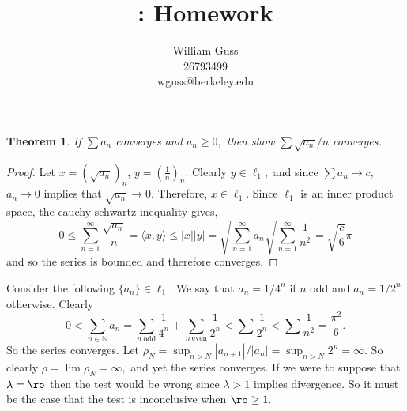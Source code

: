\documentclass[letter]{article}
\title{\bCLASS: Homework \bHWN}
\author{William Guss\\26793499\\wguss@berkeley.edu}
\newtheorem{theorem}{Theorem}
\newenvironment{menumerate}{%
  \edef\backupindent{\the\parindent}%
  \enumerate%
  \setlength{\parindent}{\backupindent}%
}{\endenumerate}
\begin{document}
\maketitle
\thispagestyle{empty}

	\begin{menumerate}
		\setcounter{enumi}{58}
		\item %

		\begin{theorem}
			If $\sum a_n$ converges and $a_n \geq 0,$ then show $\sum \sqrt{a_n}/n$ converges.
		\end{theorem}

		\begin{proof}
			Let $x = (\sqrt{a_n})_n$, $y = \left(\frac{1}{n}\right)_n$. Clearly $y \in \ell_1,$ and since $\sum a_n \to c,$ $a_n \to 0$ implies that $\sqrt{a_n} \to 0.$ Therefore, $x \in \ell_1.$ Since $\ell_1$ is an inner product space, the cauchy schwartz inequality gives, 
			$$0 \leq \sum_{n=1}^\infty \frac{\sqrt{a_n}}{n} = \langle x,y \rangle \leq |x||y| = \sqrt{\sum_{n=1}^\infty a_n} \sqrt{\sum_{n=1}^\infty \frac{1}{n^2}} = \sqrt{\frac{c}{6}}\pi$$
			and so the series is bounded and therefore converges.
		\end{proof}

		\setcounter{enumi}{60}
		\item Consider the following $\{a_n\} \in \ell_1.$ We say that $a_n = 1/4^n$ if $n$ odd and $a_n = 1/2^n$ otherwise. Clearly $$0 < \sum_{n\in\mathbb{N}}a_n = \sum_{n\ \text{odd}} \frac{1}{4^n} + \sum_{n\ \text{even}} \frac{1}{2^n} < \sum \frac{1}{2^n} < \sum \frac{1}{n^2} = \frac{\pi^2}{6}.$$ So the series converges. Let $\rho_N = \sup_{n>N} |a_{n+1}|/|a_n| = \sup_{n>N} 2^n = \infty$. So clearly $\rho = \lim \rho_N = \infty,$ and yet the series converges. If we were to suppose that $\lambda = \ro$ then the test would be wrong since $\lambda > 1$ implies divergence. So it must be the case that the test is inconclusive when $\ro \geq 1.$
		\item %
		\item %

		\setcounter{enumi}{66}
		\item %
		\item %
		\item %
		\item %
	\end{menumerate}
\end{document}
